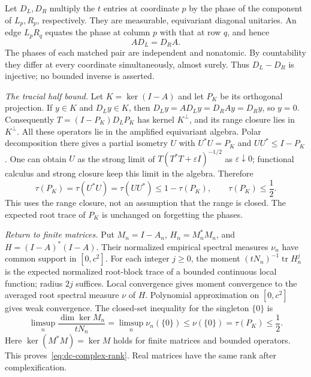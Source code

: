 \begin{informalproof}
Let $D_L,D_R$ multiply the $t$ entries at coordinate $p$ by the phase
of the component of $L_p,R_p$, respectively.  They are measurable,
equivariant diagonal unitaries.  An edge $L_pR_q$ equates the phase
at column $p$ with that at row $q$, and hence
\begin{equation}
 AD_L=D_RA.
 \label{eq:dc-intertwining}
\end{equation}
The phases of each matched pair are independent and nonatomic.
By countability they differ at every coordinate simultaneously, almost
surely.  Thus $D_L-D_R$ is injective; no bounded inverse is asserted.

\emph{The tracial half bound.}
Let $K=\ker(I-A)$ and let $P_K$ be its orthogonal projection.
If $y\in K$ and $D_Ly\in K$, then
$D_Ly=AD_Ly=D_RAy=D_Ry$, so $y=0$.
Consequently $T=(I-P_K)D_LP_K$ has kernel $K^\perp$, and its range
closure lies in $K^\perp$.
All these operators lie in the amplified equivariant algebra.
Polar decomposition there gives a partial isometry $U$ with
$U^*U=P_K$ and $UU^*\le I-P_K$.  One can obtain $U$ as the strong
limit of $T(T^*T+\varepsilon I)^{-1/2}$ as $\varepsilon\downarrow0$;
functional calculus and strong closure keep this limit in the algebra.
Therefore
\begin{equation}
 \tau(P_K)=\tau(U^*U)=\tau(UU^*)\le1-\tau(P_K),
 \qquad \tau(P_K)\le\frac12.
 \label{eq:dc-half-trace}
\end{equation}
This uses the range closure, not an assumption that the range is closed.
The expected root trace of $P_K$ is unchanged on forgetting the phases.

\emph{Return to finite matrices.}
Put $M_n=I-A_n$, $H_n=M_n^*M_n$, and $H=(I-A)^*(I-A)$.
Their normalized empirical spectral measures $\nu_n$ have common support
in $[0,c^2]$.  For each integer $j\ge0$, the moment
$(tN_n)^{-1}\operatorname{tr}H_n^j$ is the expected normalized root-block
trace of a bounded continuous local function; radius $2j$ suffices.
Local convergence gives moment convergence to the averaged root spectral
measure $\nu$ of $H$.  Polynomial approximation on $[0,c^2]$ gives weak
convergence.  The closed-set inequality for the singleton $\{0\}$ is
\begin{equation}
 \limsup_n\frac{\dim\ker M_n}{tN_n}
 =\limsup_n\nu_n(\{0\})
 \le\nu(\{0\})=\tau(P_K)\le\frac12.
 \label{eq:dc-nullity-semicontinuity}
\end{equation}
Here $\ker(M^*M)=\ker M$ holds for finite matrices and bounded operators.
This proves~\eqref{eq:dc-complex-rank}.  Real matrices have the same rank
after complexification.
\end{informalproof}

